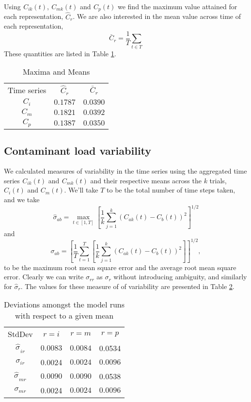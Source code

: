 \documentclass{article}
\begin{document}
Using $^{} C_{i k} (t)$, $^{} C_{m k} (t)$ and $^{} C_p (t)$ we find the
maximum value attained for each representation, $\hat{C}_r$. We are also
interested in the mean value across time of each
representation,{\hspace{<htab|0>}}
\[ \bar{C}_r = \frac{1}{T} \sum_{t \in T} \]
These quantities are listed in Table \ref{MaximaMeans}.

\begin{table}[h]
  \begin{tabular}{ccc}
    Time series & $\hat{C}_r$ & $\bar{C}_r$\\
    $C_i$ & $0.1787$ & $0.0390$\\
    $C_m$ & $0.1821$ & $0.0392$\\
    $C_p$ & $0.1387$ & $0.0350$
  \end{tabular}

  \caption{Maxima and Means\label{MaximaMeans}}
\end{table}

\subsection{Contaminant load variability}\label{LoadVar}

We calculated measures of variability in the time series using the aggregated
time series $^{} C_{i k} (t)$ and $^{} C_{m k} (t)$ and their respective means
across the $k$ trials, \ $C_i (t)$ and $C_m (t)$. We'll take $T$ to be the
total number of time steps taken, and we take
\[ \hat{\sigma}_{a b} = \max_{t \in [1, T]} \left[ \frac{1}{k} \sum_{j = 1}^k
   (C_{a k} (t) - C_b (t))^2 \right]^{1 / 2} \]
and
\[ \sigma_{a b} = \left[ \frac{1}{T} \sum_{t = 1}^T \left[ \frac{1}{k} \sum_{j
   = 1}^k (C_{a k} (t) - C_b (t))^2 \right] \right]^{1 / 2}, \]
to be the maximum root mean square error and the average root mean square
error. Clearly we can write $\sigma_{r r}$ as $\sigma_r$ without introducing
ambiguity, and similarly for $\hat{\sigma}_r$. The values for these measure of
of variability are presented in Table \ref{LoadVarTbl}.

\begin{table}[h]
  \begin{tabular}{cccc}
    StdDev & $r = i$ & $r = m$ & $r = p$\\
    $\widehat{\sigma_{}}_{i r}$ & $0.0083$ & $0.0084$ & 0.0534\\
    $\sigma_{i r}$ & 0.0024 & $0.0024$ & $0.0096$\\
    $\widehat{\sigma_{}}_{m r}$ & $0.0090$ & $0.0090$ & 0.0538\\
    $\sigma_{m r}$ & 0.0024 & $0.0024$ & $0.0096$
  \end{tabular}{\hspace{<htab|0>}}{\hspace{\hfill}}
  \caption{Deviations amongst the model runs with respect to a given
  mean\label{LoadVarTbl}}
\end{table}
\end{document}
